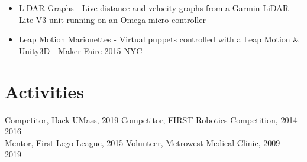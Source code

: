 \documentclass[10pt]{article}
\begin{document}
\begin{flushleft}
\begin{itemize}
		\item LiDAR Graphs - Live distance and velocity graphs from a Garmin LiDAR Lite V3 unit running on an 
			Omega micro controller

		\item Leap Motion Marionettes - Virtual puppets controlled with a Leap Motion \& Unity3D - Maker Faire 2015 NYC
	\end{itemize}

\section{Activities}
	Competitor, Hack UMass, 2019 \hfill Competitor, FIRST Robotics Competition, 2014 - 2016 \\
	Mentor, First Lego League, 2015 \hfill Volunteer, Metrowest Medical Clinic, 2009 - 2019


\end{flushleft}
\end{document}
